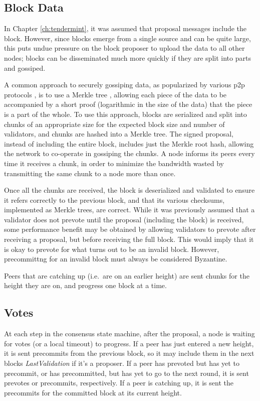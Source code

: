 \subsection{Block Data}
In Chapter \ref{ch:tendermint}, it was assumed that proposal messages include the block.
However, since blocks emerge from a single source and can be quite large, 
this puts undue pressure on the block proposer to upload the data to all other nodes;
blocks can be disseminated much more quickly if they are split into parts and gossiped.

A common approach to securely gossiping data, as popularized by various p2p protocols \cite{bittorrent,libswift}, 
is to use a Merkle tree \cite{merkle1987digital},
allowing each piece of the data to be accompanied by a short proof (logarithmic in the size of the data)
that the piece is a part of the whole. 
To use this approach, 
blocks are serialized and split into chunks of an appropriate size 
for the expected block size and number of validators,
and chunks are hashed into a Merkle tree. 
The signed proposal, instead of including the entire block, includes just the Merkle root hash,
allowing the network to co-operate in gossiping the chunks.
A node informs its peers every time it receives a chunk, 
in order to minimize the bandwidth wasted by transmitting the same chunk to a node more than once.

Once all the chunks are received, the block is deserialized and validated to ensure it refers correctly to the previous 
block, and that its various checksums, implemented as Merkle trees, are correct. 
While it was previously assumed that a validator does not prevote until the proposal (including the block) is received,
some performance benefit may be obtained by allowing validators to prevote after receiving a proposal, 
but before receiving the full block. This would imply that it is okay to prevote for what turns out to be an invalid block.
However, precommittng for an invalid block must always be considered Byzantine.

Peers that are catching up (i.e.~are on an earlier height) are sent chunks for the height they are on,
and progress one block at a time.

\subsection{Votes}

At each step in the consensus state machine, after the proposal, a node is waiting for votes (or a local timeout) to progress.
If a peer has just entered a new height, it is sent precommits from the previous block,
so it may include them in the next blocks \emph{LastValidation} if it's a proposer.
If a peer has prevoted but has yet to precommit, or has precommitted, but has yet to go to the next round,
it is sent prevotes or precommits, respectively.
If a peer is catching up, it is sent the precommits for the committed block at its current height.

